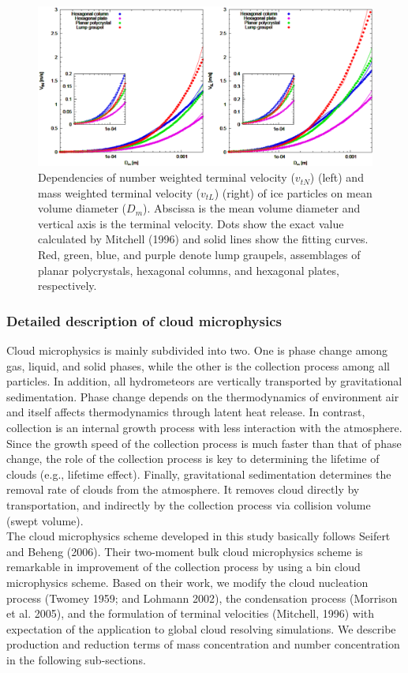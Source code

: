\begin{figure}[htbp]
\begin{center}
\includegraphics[scale=0.4]{./figure/D_vt_sn14-ice-1.eps}
\end{center}
\caption{Dependencies of number weighted terminal velocity ($v_{tN}$) (left) and mass weighted terminal velocity ($v_{tL}$) (right) of ice particles on mean volume diameter ($D_{m}$). Abscissa is the mean volume diameter and vertical axis is the terminal velocity. Dots show the exact value calculated by Mitchell (1996) and solid lines show the fitting curves. Red, green, blue, and purple denote lump graupels, assemblages of planar polycrystals, hexagonal columns, and hexagonal plates, respectively.}
\label{figsn2-14}
\end{figure}

\subsubsection{Detailed description of cloud microphysics}
Cloud microphysics is mainly subdivided into two. One is phase change among gas, liquid, and solid phases, while the other is the collection process among all particles. In addition, all hydrometeors are vertically transported by gravitational sedimentation. Phase change depends on the thermodynamics of environment air and itself affects thermodynamics through latent heat release. In contrast, collection is an internal growth process with less interaction with the atmosphere. Since the growth speed of the collection process is much faster than that of phase change, the role of the collection process is key to determining the lifetime of clouds (e.g., lifetime effect). Finally, gravitational sedimentation determines the removal rate of clouds from the atmosphere. It removes cloud directly by transportation, and indirectly by the collection process via collision volume (swept volume).\\
The cloud microphysics scheme developed in this study basically follows Seifert and Beheng (2006). Their two-moment bulk cloud microphysics scheme is remarkable in improvement of the collection process by using a bin cloud microphysics scheme. Based on their work, we modify the cloud nucleation process (Twomey 1959; and Lohmann 2002), the condensation process (Morrison et al. 2005), and the formulation of terminal velocities (Mitchell, 1996) with expectation of the application to global cloud resolving simulations. We describe production and reduction terms of mass concentration and number concentration in the following sub-sections.

